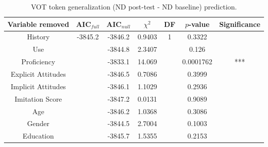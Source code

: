 \begin{table}
\centering
 \begin{tabular}{|c||c|c|c|c|c|c|} 
 \hline
 \textbf{Variable removed} & \textbf{AIC$_{full}$} & \textbf{AIC$_{null}$} & $\chi^2$ & \textbf{DF} & \textbf{$p$-value} & \textbf{Significance}\\ [0.5ex] 
 \hline
  History & \multirow{9}{*}{-3845.2} & -3846.2 & 0.9403 & \multirow{9}{*}{1} & 0.3322 & \\ 
 \cline{1-1}\cline{3-4}\cline{6-7}
 Use &  & -3844.8 & 2.3407 &  & 0.126 & \\
 \cline{1-1}\cline{3-4}\cline{6-7}
 Proficiency &  & -3833.1 & 14.069 &  & 0.0001762 & ***\\
 \cline{1-1}\cline{3-4}\cline{6-7}
 Explicit Attitudes &  & -3846.5 & 0.7086 &  & 0.3999 & \\
 \cline{1-1}\cline{3-4}\cline{6-7}
 Implicit Attitudes &  & -3846.1 & 1.1029 &  & 0.2936 & \\
 \cline{1-1}\cline{3-4}\cline{6-7}
 Imitation Score &  & -3847.2 & 0.0131 &  & 0.9089 & \\
 \cline{1-1}\cline{3-4}\cline{6-7}
 Age &  & -3846.2 & 1.0368 &  & 0.3086 & \\
 \cline{1-1}\cline{3-4}\cline{6-7}
 Gender &  & -3844.5 & 2.7004 &  & 0.1003 & \\
 \cline{1-1}\cline{3-4}\cline{6-7}
 Education &  & -3845.7 & 1.5355 &  & 0.2153 & \\
 \hline
\end{tabular}
\caption{VOT token generalization (ND post-test - ND baseline) prediction.}
\label{tab:VOTtokengnPredictors}
\end{table}

